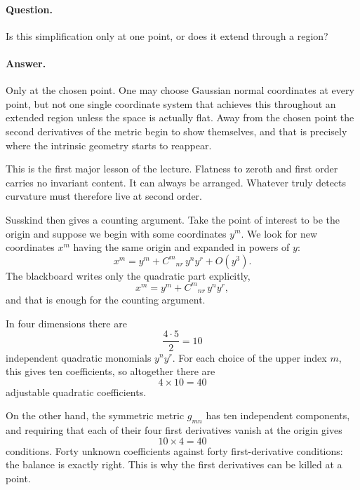 \paragraph{Question.} Is this simplification only at one point, or does it extend through a region?

\paragraph{Answer.} Only at the chosen point. One may choose Gaussian normal coordinates at every point, but not one single coordinate system that achieves this throughout an extended region unless the space is actually flat. Away from the chosen point the second derivatives of the metric begin to show themselves, and that is precisely where the intrinsic geometry starts to reappear.

This is the first major lesson of the lecture. Flatness to zeroth and first order carries no invariant content. It can always be arranged. Whatever truly detects curvature must therefore live at second order.

Susskind then gives a counting argument. Take the point of interest to be the origin and suppose we begin with some coordinates \(y^m\). We look for new coordinates \(x^m\) having the same origin and expanded in powers of \(y\):
\begin{equation}
x^m = y^m + C^m{}_{nr}\,y^n y^r + O(y^3).
\end{equation}
The blackboard writes only the quadratic part explicitly,
\[
x^m = y^m + C^m{}_{nr}\,y^n y^r,
\]
and that is enough for the counting argument.

In four dimensions there are
\begin{equation}
\frac{4\cdot 5}{2}=10
\end{equation}
independent quadratic monomials \(y^n y^r\). For each choice of the upper index \(m\), this gives ten coefficients, so altogether there are
\begin{equation}
4\times 10 = 40
\end{equation}
adjustable quadratic coefficients.

On the other hand, the symmetric metric \(g_{mn}\) has ten independent components, and requiring that each of their four first derivatives vanish at the origin gives
\begin{equation}
10\times 4 = 40
\end{equation}
conditions. Forty unknown coefficients against forty first-derivative conditions: the balance is exactly right. This is why the first derivatives can be killed at a point.

